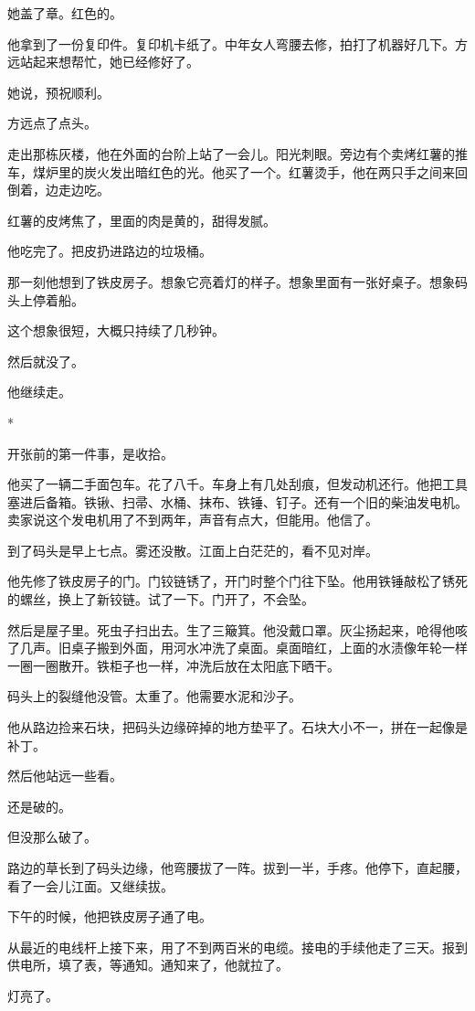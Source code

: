 \documentclass[UTF8,a5paper,11pt,openany]{ctexbook}
\newcommand{\scene}{\vspace{1em}\begin{center}*\quad*\quad*\end{center}\vspace{0.5em}}
\begin{document}
她盖了章。红色的。

他拿到了一份复印件。复印机卡纸了。中年女人弯腰去修，拍打了机器好几下。方远站起来想帮忙，她已经修好了。

她说，预祝顺利。

方远点了点头。

走出那栋灰楼，他在外面的台阶上站了一会儿。阳光刺眼。旁边有个卖烤红薯的推车，煤炉里的炭火发出暗红色的光。他买了一个。红薯烫手，他在两只手之间来回倒着，边走边吃。

红薯的皮烤焦了，里面的肉是黄的，甜得发腻。

他吃完了。把皮扔进路边的垃圾桶。

那一刻他想到了铁皮房子。想象它亮着灯的样子。想象里面有一张好桌子。想象码头上停着船。

这个想象很短，大概只持续了几秒钟。

然后就没了。

他继续走。


\scene

开张前的第一件事，是收拾。

他买了一辆二手面包车。花了八千。车身上有几处刮痕，但发动机还行。他把工具塞进后备箱。铁锹、扫帚、水桶、抹布、铁锤、钉子。还有一个旧的柴油发电机。卖家说这个发电机用了不到两年，声音有点大，但能用。他信了。

到了码头是早上七点。雾还没散。江面上白茫茫的，看不见对岸。

他先修了铁皮房子的门。门铰链锈了，开门时整个门往下坠。他用铁锤敲松了锈死的螺丝，换上了新铰链。试了一下。门开了，不会坠。

然后是屋子里。死虫子扫出去。生了三簸箕。他没戴口罩。灰尘扬起来，呛得他咳了几声。旧桌子搬到外面，用河水冲洗了桌面。桌面暗红，上面的水渍像年轮一样一圈一圈散开。铁柜子也一样，冲洗后放在太阳底下晒干。

码头上的裂缝他没管。太重了。他需要水泥和沙子。

他从路边捡来石块，把码头边缘碎掉的地方垫平了。石块大小不一，拼在一起像是补丁。

然后他站远一些看。

还是破的。

但没那么破了。

路边的草长到了码头边缘，他弯腰拔了一阵。拔到一半，手疼。他停下，直起腰，看了一会儿江面。又继续拔。

下午的时候，他把铁皮房子通了电。

从最近的电线杆上接下来，用了不到两百米的电缆。接电的手续他走了三天。报到供电所，填了表，等通知。通知来了，他就拉了。

灯亮了。
\end{document}
